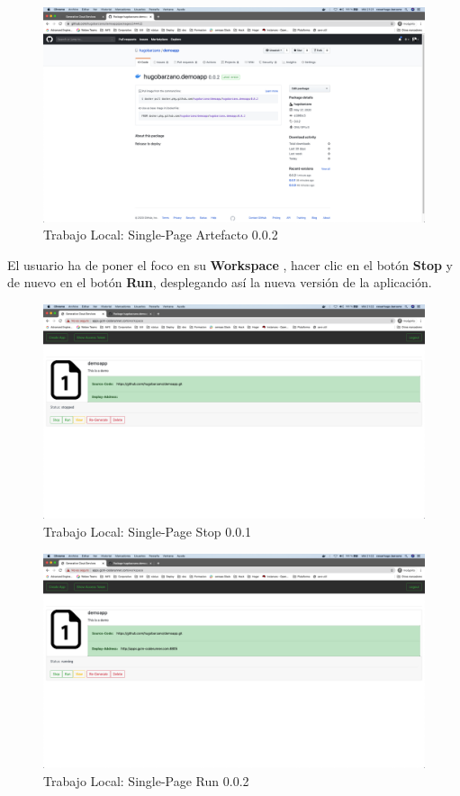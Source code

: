 \documentclass[a4paper,11pt]{book}
\begin{document}
   \begin{figure}[H]
\centering
\includegraphics[scale=0.2]{imagenes/casouso/3_8.png}
\caption{ Trabajo Local: Single-Page Artefacto 0.0.2  }
\end{figure}


 El usuario ha de poner el foco en su \textbf{Workspace} , hacer clic en el botón \textbf{Stop} y de nuevo en el botón \textbf{Run}, desplegando así la nueva versión de la aplicación. 
 
\begin{figure}[H]
\centering
\includegraphics[scale=0.2]{imagenes/casouso/3_9.png}
\caption{ Trabajo Local: Single-Page Stop 0.0.1    }
\end{figure}
 
 
   \begin{figure}[H]
\centering
\includegraphics[scale=0.2]{imagenes/casouso/3_10.png}
\caption{  Trabajo Local: Single-Page Run 0.0.2 }
\end{figure}
 
\end{document}
